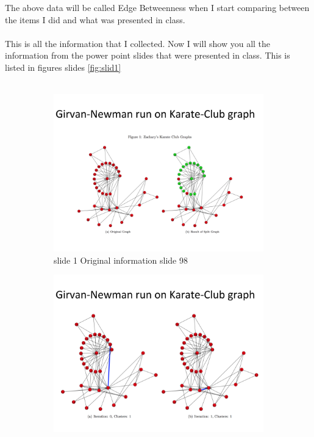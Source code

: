 \documentclass[10pt,letterpaper]{article}
\begin{document}
The above data will be called Edge Betweenness when I start comparing between the items I did and what was presented in class.\\
\\
This is all the information that I collected.  Now I will show you all the information from the power point slides that were presented in class.   This is listed in figures \/ slides \ref{fig:slid1}\\
\\
\begin{figure}[H]
  \centering
  \begin{subfigure}[b]{0.4\linewidth}
     \includegraphics[width=\linewidth]{slide98.png}
     \caption{slide 1 Original information slide 98}
  \end{subfigure}
  \begin{subfigure}[b]{0.4\linewidth}
     \includegraphics[width=\linewidth]{slide99.png} 

\end{subfigure}
\end{figure}
\end{document}

